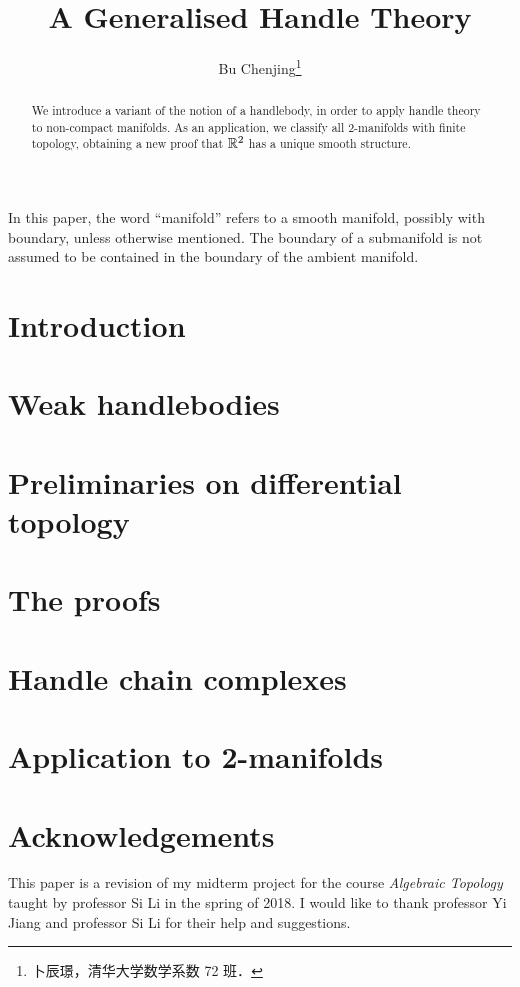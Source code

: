 \documentclass[twoside]{article}
\begin{document}
\title{A Generalised Handle Theory}
\author{Bu Chenjing\footnote{卜辰璟，清华大学数学系数 72 班．}}

\begin{abstract}
    We introduce a variant of the notion of a handlebody,
    in order to apply handle theory to non-compact manifolds.
    As an application, we classify all $2$-manifolds
    with finite topology, obtaining a new proof that
    $\mathbb{R}^2$ has a unique smooth structure.
\end{abstract}

\tableofcontents
\bigskip

\begin{convention}
    In this paper, the word ``manifold''
    refers to a smooth manifold, possibly with boundary,
    unless otherwise mentioned.
    The boundary of a submanifold is not assumed
    to be contained in the boundary of the ambient manifold.
\end{convention}

\section{Introduction}



\section{Weak handlebodies}



\section{Preliminaries on differential topology}



\section{The proofs}



\section{Handle chain complexes}



\section{Application to 2-manifolds}



\section*{Acknowledgements}

This paper is a revision of my midterm project
for the course \emph{Algebraic Topology}
taught by professor Si Li in the spring of 2018.
I would like to thank professor Yi Jiang and professor Si Li 
for their help and suggestions.

\printbibliography
\end{document}
